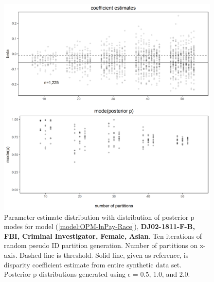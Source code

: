 \documentclass[10pt, letterpaper]{article}
\begin{document}
\begin{spacing}{1.0}
\begin{figure}[h!]
    \centering
    \includegraphics[width=5in]{images/RacePayDifferentialBetaWithPosteriorDistribution-DJ02-1811-F-B.png}
    \caption{Parameter estimate distribution with distribution of posterior p modes for model (\ref{model:OPM-lnPay-Race}), \textbf{DJ02-1811-F-B, FBI, Criminal Investigator, Female, Asian}.  Ten iterations of random pseudo ID partition generation.  Number of partitions on x-axis.  Dashed line is threshold.  Solid line, given as reference, is disparity coefficient estimate from entire synthetic data set.  Posterior p distributions generated using $\epsilon$ = 0.5, 1.0, and 2.0.}
    \label{figure:RacePayDifferentialBetaWithPosteriorDistribution-DJ02-1811-F-B}
\end{figure}

\clearpage


\end{spacing}
\end{document}
